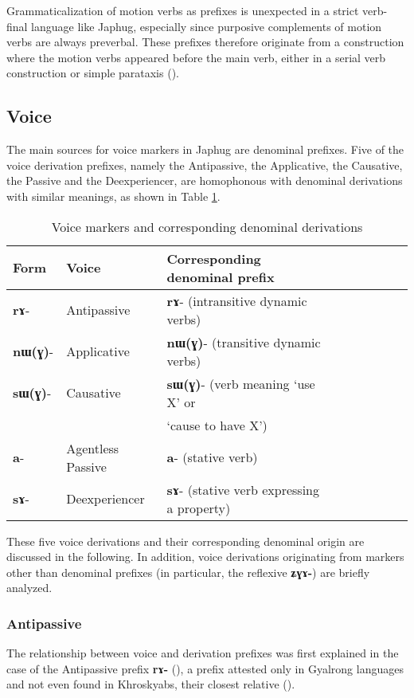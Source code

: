 \documentclass[oldfontcommands,oneside,a4paper,11pt]{article}
\newcommand{\ipa}[1]{\mbox{\phon\textbf{#1}}} %
\begin{document}
Grammaticalization of motion verbs as prefixes is unexpected in a strict verb-final language like Japhug, especially since purposive complements of motion verbs are always preverbal. These prefixes therefore originate from a construction where the motion verbs appeared before the main verb, either in a serial verb construction or simple parataxis (\citealt{jacques13harmonization}).

\subsection{Voice}
The main sources for voice markers in Japhug are denominal prefixes. Five of the voice derivation prefixes, namely the Antipassive, the Applicative, the Causative, the Passive and the Deexperiencer, are homophonous with denominal derivations with similar meanings, as shown in Table \ref{tab:denom}.

\begin{table}[H] \caption{Voice markers and corresponding denominal derivations} \label{tab:denom} \centering
\begin{tabular}{lllllllll} \toprule
Form& Voice & Corresponding denominal prefix \\
\midrule
\ipa{rɤ}- & Antipassive &    \ipa{rɤ}- (intransitive dynamic verbs)\\
\ipa{nɯ(ɣ)}- & Applicative &    \ipa{nɯ(ɣ)}- (transitive dynamic verbs)\\
\ipa{sɯ(ɣ)}- & Causative &    \ipa{sɯ(ɣ)}- (verb meaning `use X' or \\
&& `cause to have X') \\
\ipa{a}- & Agentless Passive &    \ipa{a}- (stative verb)\\
\ipa{sɤ}-  & Deexperiencer &    \ipa{sɤ}- (stative verb expressing a property)\\
    \bottomrule
\end{tabular}
\end{table}

These five voice derivations and their corresponding denominal origin are discussed in the following. In addition, voice derivations originating from markers other than denominal prefixes (in particular, the reflexive \ipa{ʑɣɤ-}) are briefly analyzed.

\subsubsection{Antipassive} \label{sec:apass}
The relationship between voice and derivation prefixes was first explained in the case of the Antipassive prefix \ipa{rɤ-} (\citealt{jacques14antipassive}), a prefix attested only in Gyalrong languages and not even found in Khroskyabs, their closest relative (\citealt{lai13affixale}).
\end{document}

